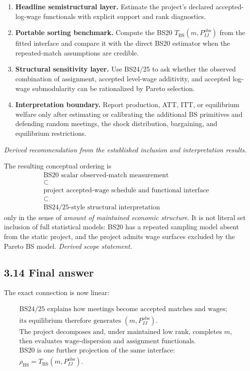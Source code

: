 \documentclass[11pt]{article}
\begin{document}
\begin{enumerate}
\item \textbf{Headline semistructural layer.}  Estimate the project's declared
  accepted-log-wage functionals with explicit support and rank diagnostics.
\item \textbf{Portable sorting benchmark.}  Compute the BS20
  \(T_{\mathrm{BS}}(m,P^{\mathrm{obs}}_{IJ})\) from the fitted interface and
  compare it with the direct BS20 estimator when the repeated-match
  assumptions are credible.
\item \textbf{Structural sensitivity layer.}  Use BS24/25 to ask whether the
  observed combination of assignment, accepted level-wage additivity, and
  accepted log-wage submodularity can be rationalized by Pareto selection.
\item \textbf{Interpretation boundary.}  Report production, ATT, ITT, or
  equilibrium welfare only after estimating or calibrating the additional BS
  primitives and defending random meetings, the shock distribution,
  bargaining, and equilibrium restrictions.
\end{enumerate}

\textit{Derived recommendation from the established inclusion and
interpretation results.}

The resulting conceptual ordering is
\[
\boxed{
\begin{array}{c}
\text{BS20 scalar observed-match measurement}\\
\subset\\
\text{project accepted-wage schedule and functional interface}\\
\subset\\
\text{BS24/25-style structural interpretation}
\end{array}}
\tag{T3.79}
\]
only in the sense of \emph{amount of maintained economic structure}.  It is
not literal set inclusion of full statistical models: BS20 has a repeated
sampling model absent from the static project, and the project admits wage
surfaces excluded by the Pareto BS model.
\textit{Derived scope statement.}

\subsection{3.14 Final answer}

The exact connection is now linear:

\[
\boxed{
\begin{array}{c}
\text{BS24/25 explains how meetings become accepted matches and wages;}\\
\text{its equilibrium therefore generates }(m,P^{\mathrm{obs}}_{IJ}).\\[0.4em]
\text{The project decomposes and, under maintained low rank, completes }m,\\
\text{then evaluates wage-dispersion and assignment functionals.}\\[0.4em]
\text{BS20 is one further projection of the same interface:}\\
\rho_{\mathrm{BS}}
=
T_{\mathrm{BS}}(m,P^{\mathrm{obs}}_{IJ}).
\end{array}}
\tag{T3.80}
\]
\end{document}
